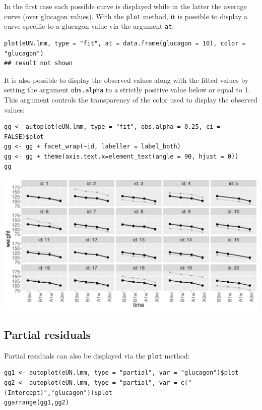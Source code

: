 \documentclass[12pt]{article}
\begin{document}
In the first case each possible curve is displayed while in the latter
the average curve (over glucagon values). With the \texttt{plot} method,
it is possible to display a curve specific to a glucagon value via the
argument \texttt{at}:
\lstset{language=r,label= ,caption= ,captionpos=b,numbers=none}
\begin{lstlisting}
plot(eUN.lmm, type = "fit", at = data.frame(glucagon = 10), color = "glucagon")
## result not shown
\end{lstlisting}

It is also possible to display the observed values along with the
fitted values by setting the argument \texttt{obs.alpha} to a strictly
positive value below or equal to 1. This argument controls the
transparency of the color used to display the observed values:
\lstset{language=r,label= ,caption= ,captionpos=b,numbers=none}
\begin{lstlisting}
gg <- autoplot(eUN.lmm, type = "fit", obs.alpha = 0.25, ci = FALSE)$plot
gg <- gg + facet_wrap(~id, labeller = label_both)
gg <- gg + theme(axis.text.x=element_text(angle = 90, hjust = 0))
gg
\end{lstlisting}

\begin{center}
\includegraphics[width=\textwidth]{./figures/fit-autoplot-indiv.pdf}
\end{center}

\clearpage

\subsection{Partial residuals}
\label{sec:org37f1c0c}

Partial residuals can also be displayed via the \texttt{plot} method:
\lstset{language=r,label= ,caption= ,captionpos=b,numbers=none}
\begin{lstlisting}
gg1 <- autoplot(eUN.lmm, type = "partial", var = "glucagon")$plot
gg2 <- autoplot(eUN.lmm, type = "partial", var = c("(Intercept)","glucagon"))$plot
ggarrange(gg1,gg2)
\end{lstlisting}
\end{document}
